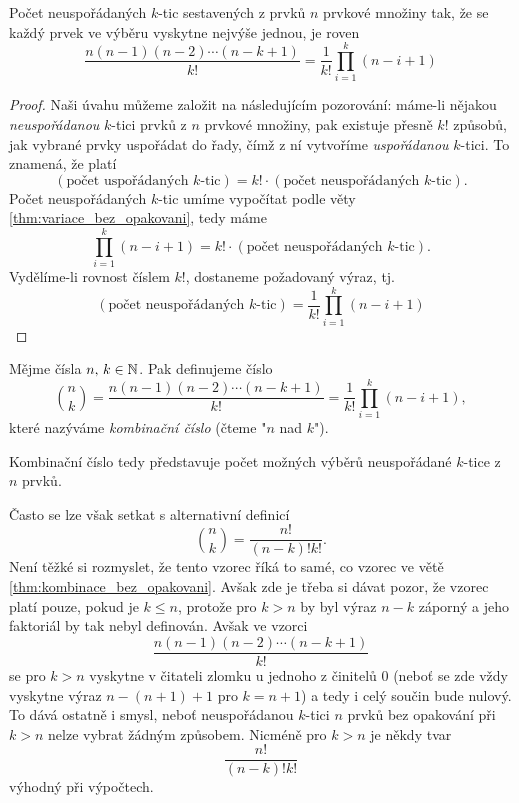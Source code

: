 \begin{theorem}\label{thm:kombinace_bez_opakovani}
    Počet neuspořádaných $k$-tic sestavených z prvků $n$ prvkové množiny tak, že se každý prvek ve výběru vyskytne nejvýše jednou, je roven
    \begin{equation*}
        \dfrac{n(n-1)(n-2)\cdots(n-k+1)}{k!}=\dfrac{1}{k!}\prod_{i=1}^{k}(n-i+1)
    \end{equation*}
\end{theorem}
\begin{proof}
    Naši úvahu můžeme založit na následujícím pozorování: máme-li nějakou \emph{neuspořádanou} $k$-tici prvků z $n$ prvkové množiny, pak existuje přesně $k!$ způsobů, jak vybrané prvky uspořádat do řady, čímž z ní vytvoříme \emph{uspořádanou} $k$-tici. To znamená, že platí
    \begin{equation*}
        (\text{počet uspořádaných $k$-tic})=k!\cdot(\text{počet neuspořádaných $k$-tic}).
    \end{equation*}
    Počet neuspořádaných $k$-tic umíme vypočítat podle věty \ref{thm:variace_bez_opakovani}, tedy máme
    \begin{equation*}
        \prod_{i=1}^{k}(n-i+1)=k!\cdot(\text{počet neuspořádaných $k$-tic}).
    \end{equation*}
    Vydělíme-li rovnost číslem $k!$, dostaneme požadovaný výraz, tj.
    \begin{equation*}
        (\text{počet neuspořádaných $k$-tic})=\dfrac{1}{k!}\prod_{i=1}^{k}(n-i+1)
    \end{equation*}
\end{proof}

\begin{definition}
    Mějme čísla $n,\,k\in\mathbb{N}$. Pak definujeme číslo
    \[
        \binom{n}{k}=\dfrac{n(n-1)(n-2)\cdots(n-k+1)}{k!}=\dfrac{1}{k!}\prod_{i=1}^{k}(n-i+1),
    \]
    které nazýváme \emph{kombinační číslo} (čteme "$n$ nad $k$").
\end{definition}

\begin{remark}\label{rem:kombinacni_cislo_vypocet}
    Kombinační číslo tedy představuje počet možných výběrů neuspořádané $k$-tice z $n$ prvků.\par
    Často se lze však setkat s alternativní definicí
    \[
        \binom{n}{k}=\dfrac{n!}{(n-k)!k!}.
    \]
    Není těžké si rozmyslet, že tento vzorec říká to samé, co vzorec ve větě \ref{thm:kombinace_bez_opakovani}. Avšak zde je třeba si dávat pozor, že vzorec platí pouze, pokud je $k\leqslant n$, protože pro $k>n$ by byl výraz $n-k$ záporný a jeho faktoriál by tak nebyl definován. Avšak ve vzorci
    \[\dfrac{n(n-1)(n-2)\cdots(n-k+1)}{k!}\]
    se pro $k>n$ vyskytne v čitateli zlomku u jednoho z činitelů 0 (neboť se zde vždy vyskytne výraz $n-(n+1)+1$ pro $k=n+1$) a tedy i celý součin bude nulový. To dává ostatně i smysl, neboť neuspořádanou $k$-tici $n$ prvků bez opakování při $k>n$ nelze vybrat žádným způsobem. Nicméně pro $k>n$ je někdy tvar
    \[\dfrac{n!}{(n-k)!k!}\]
    výhodný při výpočtech.
\end{remark}


